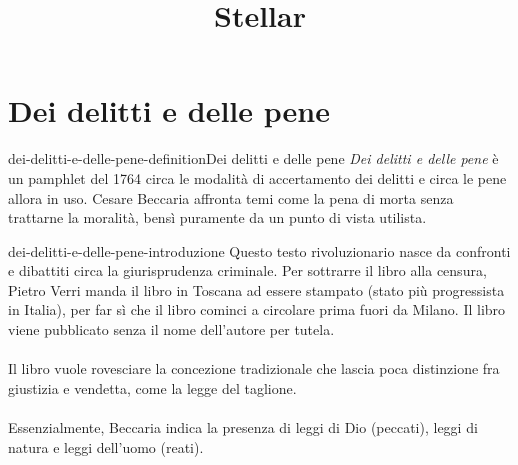 \documentclass[preview]{standalone}
\begin{document}
\title{Stellar}
\genpage

\section{Dei delitti e delle pene}

\begin{snippetdefinition}{dei-delitti-e-delle-pene-definition}{Dei delitti e delle pene}
    \textit{Dei delitti e delle pene} è un pamphlet del 1764 circa
    le modalità di accertamento dei delitti e circa le pene allora in uso.
    Cesare Beccaria affronta temi come la pena di morta senza trattarne la moralità, bensì puramente
    da un punto di vista utilista.
\end{snippetdefinition}

\begin{snippet}{dei-delitti-e-delle-pene-introduzione}
    Questo testo rivoluzionario nasce da confronti e dibattiti circa la giurisprudenza criminale.
    Per sottrarre il libro alla censura, Pietro Verri manda il libro in Toscana
    ad essere stampato (stato più progressista in Italia),
    per far sì che il libro cominci a circolare prima fuori da Milano.
    Il libro viene pubblicato senza il nome dell'autore per tutela.
    \\\\
    Il libro vuole rovesciare la concezione tradizionale che lascia poca distinzione fra giustizia e vendetta,
    come la legge del taglione.
    \\\\
    Essenzialmente, Beccaria indica la presenza di leggi di Dio (peccati), leggi di natura e leggi dell'uomo (reati).
\end{snippet}
\end{document}
